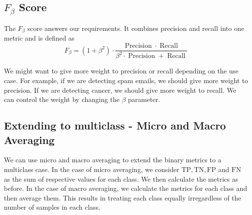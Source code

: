 \subsection{$F_{\beta}$ Score}
The $F_{\beta}$ score answers our requirements.
It combines precision and recall into one metric and is defined as
\begin{equation}
    \label{eq:f1}
    F_{\beta} = (1 + \beta^2) \cdot \frac{\operatorname{Precision} \cdot \operatorname{Recall}}{\beta^2 \cdot \operatorname{Precision} + \operatorname{Recall}}
\end{equation}

We might want to give more weight to precision or recall depending on the use case.
For example, if we are detecting spam emails, we should give more weight to precision.
If we are detecting cancer, we should give more weight to recall.
We can control the weight by changing the $\beta$ parameter.

\subsection{Extending to multiclass - Micro and Macro Averaging}
We can use micro and macro averaging to extend the binary metrics to a multiclass case.
In the case of micro averaging, we consider $\mathrm{TP}, \mathrm{TN}, \mathrm{FP}$ and $\mathrm{FN}$ as the sum of respective values for each class.
We then calculate the metrics as before.
In the case of macro averaging, we calculate the metrics for each class and then average them.
This results in treating each class equally irregardless of the number of samples in each class.

